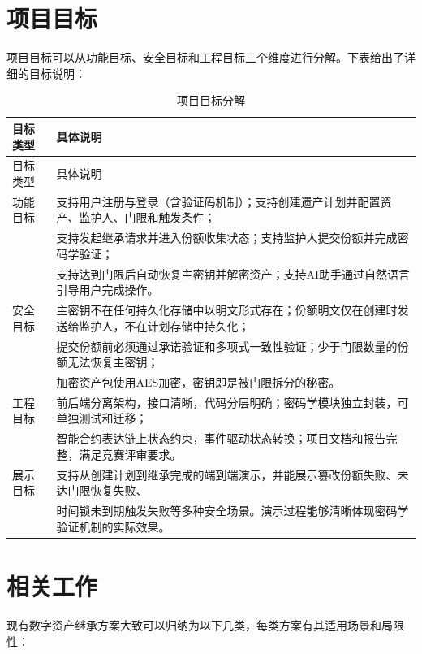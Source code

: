 \documentclass[UTF8,a4paper,zihao=-4,openany]{ctexrep}
\begin{document}
\section{项目目标}

项目目标可以从功能目标、安全目标和工程目标三个维度进行分解。下表给出了详细的目标说明：

\setlength{\extrarowheight}{3pt}
\begin{longtable}{p{3cm}p{11.4cm}}
\caption{项目目标分解}\\
\toprule
目标类型 & 具体说明\\
\midrule
\endfirsthead
\toprule
目标类型 & 具体说明\\
\midrule
\endhead
功能目标 & 支持用户注册与登录（含验证码机制）；支持创建遗产计划并配置资产、监护人、门限和触发条件；\\& 支持发起继承请求并进入份额收集状态；支持监护人提交份额并完成密码学验证；\\& 支持达到门限后自动恢复主密钥并解密资产；支持AI助手通过自然语言引导用户完成操作。\\
安全目标 & 主密钥不在任何持久化存储中以明文形式存在；份额明文仅在创建时发送给监护人，不在计划存储中持久化；\\& 提交份额前必须通过承诺验证和多项式一致性验证；少于门限数量的份额无法恢复主密钥；\\& 加密资产包使用AES加密，密钥即是被门限拆分的秘密。\\
工程目标 & 前后端分离架构，接口清晰，代码分层明确；密码学模块独立封装，可单独测试和迁移；\\& 智能合约表达链上状态约束，事件驱动状态转换；项目文档和报告完整，满足竞赛评审要求。\\
展示目标 & 支持从创建计划到继承完成的端到端演示，并能展示篡改份额失败、未达门限恢复失败、\\& 时间锁未到期触发失败等多种安全场景。演示过程能够清晰体现密码学验证机制的实际效果。\\
\bottomrule
\end{longtable}
\setlength{\extrarowheight}{0pt}

\section{相关工作}

现有数字资产继承方案大致可以归纳为以下几类，每类方案有其适用场景和局限性：
\end{document}

